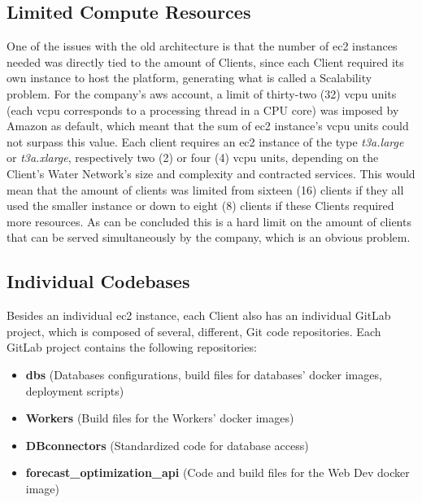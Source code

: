 \subsection{Limited Compute Resources}\label{methodology:ss:limited-compute-resources}

One of the issues with the old architecture is that the number of \gls{ec2} instances needed was directly tied to the amount of Clients, since each Client required its own instance to host the platform, generating what is called a Scalability problem. For the company's \gls{aws} account, a limit of thirty-two (32) \gls{vcpu} units (each \gls{vcpu} corresponds to a processing thread in a CPU core) was imposed by Amazon as default, which meant that the sum of \gls{ec2} instance's \gls{vcpu} units could not surpass this value. Each client requires an \gls{ec2} instance of the type \textit{t3a.large} or \textit{t3a.xlarge}, respectively two (2) or four (4) \gls{vcpu} units, depending on the Client's Water Network's size and complexity and contracted services. This would mean that the amount of clients was limited from sixteen (16) clients if they all used the smaller instance or down to eight (8) clients if these Clients required more resources. As can be concluded this is a hard limit on the amount of clients that can be served simultaneously by the company, which is an obvious problem.

\subsection{Individual Codebases}\label{methodology:ss:individual-codebases}

Besides an individual \gls{ec2} instance, each Client also has an individual GitLab \parencite{gitlab_2022} project, which is composed of several, different, Git \parencite{git} code repositories. Each GitLab project contains the following repositories:

\begin{itemize}

    \item \textbf{dbs} (Databases configurations, build files for databases' docker images, deployment scripts)
    \item \textbf{Workers} (Build files for the Workers' docker images)
    \item \textbf{DBconnectors} (Standardized code for database access)
    \item \textbf{forecast\_optimization\_api} (Code and build files for the Web Dev docker image)
    
\end{itemize}

